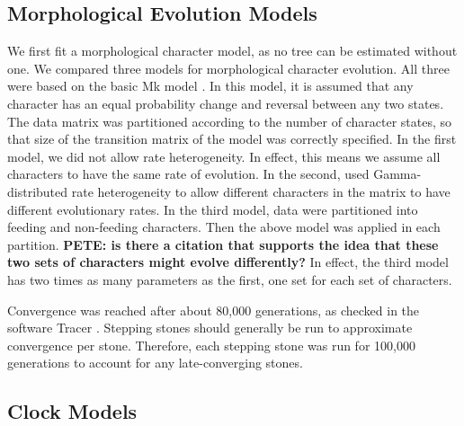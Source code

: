 \documentclass{article}
\begin{document}
\subsection{Morphological Evolution Models}
We first fit a morphological character model, as no tree can be estimated without one.
We compared three models for morphological character evolution. 
All three were based on the basic Mk model \citep{Lewis2001}. 
In this model, it is assumed that any character has an equal probability change and reversal between any two states. 
The data matrix was partitioned according to the number of character states, so that size of the transition matrix of the model was correctly specified.
In the first model, we did not allow rate heterogeneity. 
In effect, this means we assume all characters to have the same rate of evolution.
In the second, used Gamma-distributed rate heterogeneity to allow different characters in the matrix to have different evolutionary rates.
In the third model, data were partitioned into feeding and non-feeding characters.
Then the above model was applied in each partition. \textbf{PETE: is there a citation that supports the idea that these two sets of characters might evolve differently?}
In effect, the third model has two times as many parameters as the first, one set for each set of characters.

Convergence was reached after about 80,000 generations, as checked in the software Tracer \citep{Rambaut2018}. 
Stepping stones should generally be run to approximate convergence per stone.
Therefore, each stepping stone was run for 100,000 generations to account for any late-converging stones.

\subsection{Clock Models}
\end{document}

